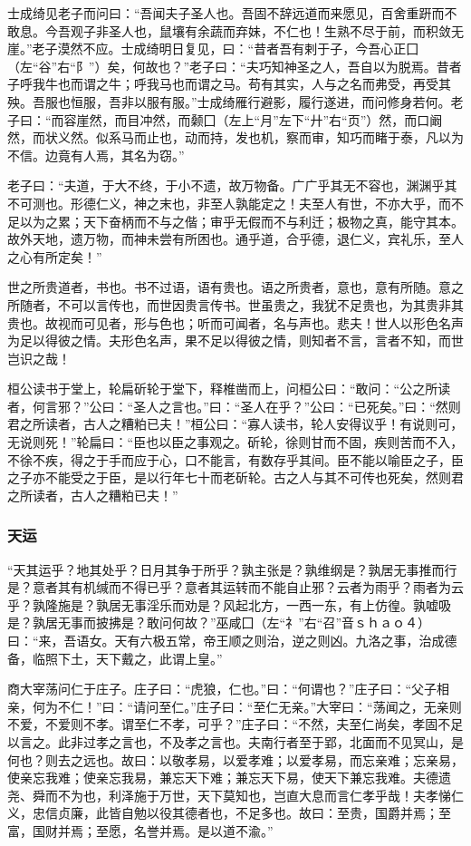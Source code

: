 \documentclass[]{article}
\begin{document}
士成绮见老子而问曰：``吾闻夫子圣人也。吾固不辞远道而来愿见，百舍重趼而不敢息。今吾观子非圣人也，鼠壤有余蔬而弃妹，不仁也！生熟不尽于前，而积敛无崖。''老子漠然不应。士成绮明日复见，曰：``昔者吾有剌于子，今吾心正囗（左``谷''右``阝''）矣，何故也？''老子曰：``夫巧知神圣之人，吾自以为脱焉。昔者子呼我牛也而谓之牛；呼我马也而谓之马。苟有其实，人与之名而弗受，再受其殃。吾服也恒服，吾非以服有服。''士成绮雁行避影，履行遂进，而问修身若何。老子曰：``而容崖然，而目冲然，而颡囗（左上``月''左下``廾''右``页''）然，而口阚然，而状义然。似系马而止也，动而持，发也机，察而审，知巧而睹于泰，凡以为不信。边竟有人焉，其名为窃。''

老子曰：``夫道，于大不终，于小不遗，故万物备。广广乎其无不容也，渊渊乎其不可测也。形德仁义，神之末也，非至人孰能定之！夫至人有世，不亦大乎，而不足以为之累；天下奋柄而不与之偕；审乎无假而不与利迁；极物之真，能守其本。故外天地，遗万物，而神未尝有所困也。通乎道，合乎德，退仁义，宾礼乐，至人之心有所定矣！''

世之所贵道者，书也。书不过语，语有贵也。语之所贵者，意也，意有所随。意之所随者，不可以言传也，而世因贵言传书。世虽贵之，我犹不足贵也，为其贵非其贵也。故视而可见者，形与色也；听而可闻者，名与声也。悲夫！世人以形色名声为足以得彼之情。夫形色名声，果不足以得彼之情，则知者不言，言者不知，而世岂识之哉！

桓公读书于堂上，轮扁斫轮于堂下，释椎凿而上，问桓公曰：``敢问：``公之所读者，何言邪？''公曰：``圣人之言也。''曰：``圣人在乎？''公曰：``已死矣。''曰：``然则君之所读者，古人之糟粕已夫！''桓公曰：``寡人读书，轮人安得议乎！有说则可，无说则死！''轮扁曰：``臣也以臣之事观之。斫轮，徐则甘而不固，疾则苦而不入，不徐不疾，得之于手而应于心，口不能言，有数存乎其间。臣不能以喻臣之子，臣之子亦不能受之于臣，是以行年七十而老斫轮。古之人与其不可传也死矣，然则君之所读者，古人之糟粕已夫！''

\hypertarget{header-n264}{%
\subsubsection{天运}\label{header-n264}}

``天其运乎？地其处乎？日月其争于所乎？孰主张是？孰维纲是？孰居无事推而行是？意者其有机缄而不得已乎？意者其运转而不能自止邪？云者为雨乎？雨者为云乎？孰隆施是？孰居无事淫乐而劝是？风起北方，一西一东，有上仿徨。孰嘘吸是？孰居无事而披拂是？敢问何故？''巫咸囗（左``礻''右``召''音ｓｈａｏ４）曰：``来，吾语女。天有六极五常，帝王顺之则治，逆之则凶。九洛之事，治成德备，临照下土，天下戴之，此谓上皇。''

商大宰荡问仁于庄子。庄子曰：``虎狼，仁也。''曰：``何谓也？''庄子曰：``父子相亲，何为不仁！''曰：``请问至仁。''庄子曰：``至仁无亲。''大宰曰：``荡闻之，无亲则不爱，不爱则不孝。谓至仁不孝，可乎？''庄子曰：``不然，夫至仁尚矣，孝固不足以言之。此非过孝之言也，不及孝之言也。夫南行者至于郢，北面而不见冥山，是何也？则去之远也。故曰：以敬孝易，以爱孝难；以爱孝易，而忘亲难；忘亲易，使亲忘我难；使亲忘我易，兼忘天下难；兼忘天下易，使天下兼忘我难。夫德遗尧、舜而不为也，利泽施于万世，天下莫知也，岂直大息而言仁孝乎哉！夫孝悌仁义，忠信贞廉，此皆自勉以役其德者也，不足多也。故曰：至贵，国爵并焉；至富，国财并焉；至愿，名誉并焉。是以道不渝。''
\end{document}
